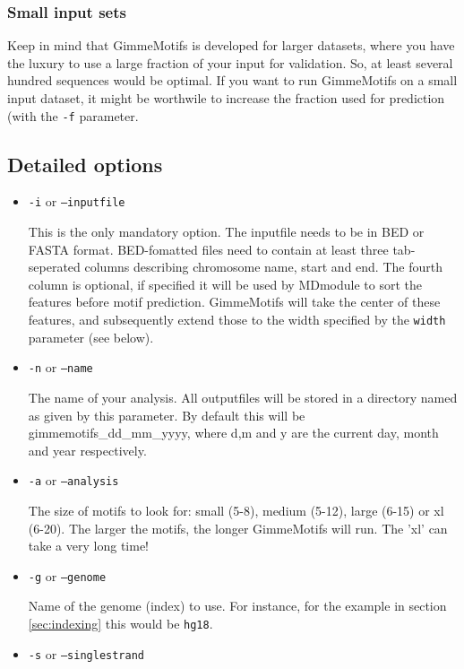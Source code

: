 \documentclass[11pt]{article}
\begin{document}
\subsubsection{Small input sets}
Keep in mind that GimmeMotifs is developed for larger datasets, where you have the luxury to use a large fraction of your input for validation. So, at least several hundred sequences would be optimal. If you want to run GimmeMotifs on a small input dataset, it might be worthwile to increase the fraction used for prediction (with the \texttt{-f} parameter.

\subsection{Detailed options}
\begin{itemize}
\item 
\texttt{-i} or \texttt{--inputfile}

This is the only mandatory option. The inputfile needs to be in BED or FASTA format. BED-fomatted files need to contain at least three tab-seperated columns describing chromosome name, start and end. The fourth column is optional, if specified it will be used by MDmodule to sort the features before motif prediction. GimmeMotifs will take the center of these features, and subsequently extend those to the width specified by the \texttt{width} parameter (see below).

\item 
\texttt{-n} or \texttt{--name}

The name of your analysis. All outputfiles will be stored in a directory named as given by this parameter. By default this will be gimmemotifs\_dd\_mm\_yyyy, where d,m and y are the current day, month and year respectively.

\item 
\texttt{-a} or \texttt{--analysis}

The size of motifs to look for: small (5-8), medium (5-12), large (6-15) or xl (6-20). The larger the motifs, the longer GimmeMotifs will run. The 'xl' can take a very long time!

\item 
\texttt{-g} or \texttt{--genome}

Name of the genome (index) to use. For instance, for the example in section \ref{sec:indexing} this would be \texttt{hg18}.

\item 
\texttt{-s} or \texttt{--singlestrand}


\end{itemize}
\end{document}
